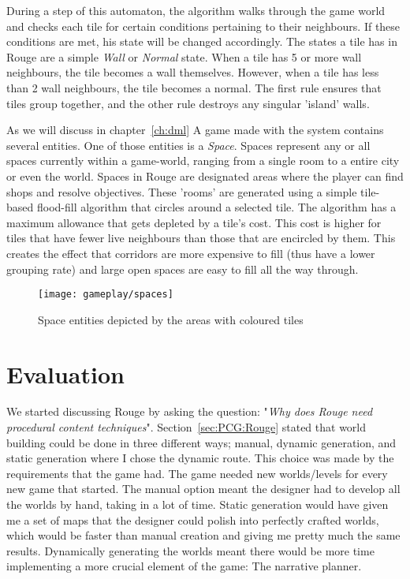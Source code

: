 During a step of this automaton, the algorithm walks through the game world and checks each tile for certain conditions pertaining to their neighbours. If these conditions are met, his state will be changed accordingly. The states a tile has in Rouge are a simple \textit{Wall} or \textit{Normal} state. When a tile has 5 or more wall neighbours, the tile becomes a wall themselves. However, when a tile has less than 2 wall neighbours, the tile becomes a normal. The first rule ensures that tiles group together, and the other rule destroys any singular 'island' walls.

As we will discuss in chapter~\ref{ch:dml} A game made with the \diage system contains several entities.
One of those entities is a \textit{Space}.
Spaces represent any or all spaces currently within a game-world, ranging from a single room to a entire city or even the world. Spaces in Rouge are designated areas where the player can find shops and resolve \his objectives. These 'rooms' are generated using a simple tile-based flood-fill algorithm that circles around a selected tile. The algorithm has a maximum allowance that gets depleted by a tile's cost. This cost is higher for tiles that have fewer live neighbours than those that are encircled by them. This creates the effect that corridors are more expensive to fill (thus have a lower grouping rate) and large open spaces are easy to fill all the way through.

\begin{figure}[H]
	\texttt{[image: gameplay/spaces]}
	\caption{Space entities depicted by the areas with coloured tiles}\label{img:gameplay:spaces}
\end{figure}


\section{Evaluation}
We started discussing Rouge by asking the question: "\textit{Why does Rouge need procedural content techniques}". 
Section~\ref{sec:PCG:Rouge} stated that world building could be done in three different ways; manual, dynamic generation, and static generation where I chose the dynamic route.
This choice was made by the requirements that the game had.
The game needed new worlds/levels for every new game that started. 
The manual option meant the designer had to develop all the worlds by hand, taking in a lot of time. 
Static generation would have given me a set of maps that the designer could polish into perfectly crafted worlds, which would be faster than manual creation and giving me pretty much the same results.
Dynamically generating the worlds meant there would be more time implementing a more crucial element of the game: The narrative planner. 

